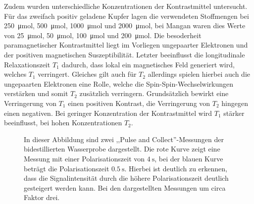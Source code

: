 Zudem wurden unterschiedliche Konzentrationen der Kontrastmittel untersucht. 
Für das zweifach positiv geladene Kupfer lagen die verwendeten Stoffmengen bei \SI{250}{\micro \mol}, \SI{500}{\micro \mol}, \SI{1000}{\micro \mol} und \SI{2000}{\micro \mol}, bei Mangan waren dies Werte von \SI{25}{\micro \mol}, \SI{50}{\micro \mol}, \SI{100}{\micro \mol} und \SI{200}{\micro \mol}.
Die besoderheit paramagnetischer Kontrastmittel liegt im Vorliegen ungepaarter Elektronen und der positiven magnetischen Suszeptibilität.
Letzter beeinflusst die longitudinale Relaxationszeit $T_1$ dadurch, dass lokal ein magnetisches Feld generiert wird, welches $T_1$ verringert.
Gleiches gilt auch für $T_2$ allerdings spielen hierbei auch die ungepaarten Elektronen eine Rolle, welche die Spin-Spin-Wechselwirkungen verstärken und somit $T_2$ zusätzlich verringern.
Grundsätzlich bewirkt eine Verringerung von $T_1$ einen positiven Kontrast, die Verringerung von $T_2$ hingegen einen negativen.
Bei geringer Konzentration der Kontrastmittel wird $T_1$ stärker beeinflusst, bei hohen Konzentrationen $T_2$. \cite{Schmidt}

\begin{figure}[H]
    \centering
    
    \caption[Abhängigkeit der Signalintensität von der Polarisationszeit.]{In dieser Abbildung sind zwei ,,Pulse and Collect''-Messungen der bidestillierten Wasserprobe dargestellt. Die rote Kurve zeigt eine Messung mit einer Polarisationszeit von $\SI{4}{\second}$, bei der blauen Kurve beträgt die Polarisationszeit $\SI{0.5}{\second}$. Hierbei ist deutlich zu erkennen, dass die Signalintensität durch die höhere Polarisationszeit deutlich gesteigert werden kann. Bei den dargestellten Messungen um circa Faktor drei.} 
    \label{fig:SignalintensitaetPolarisationszeit}    
\end{figure}

